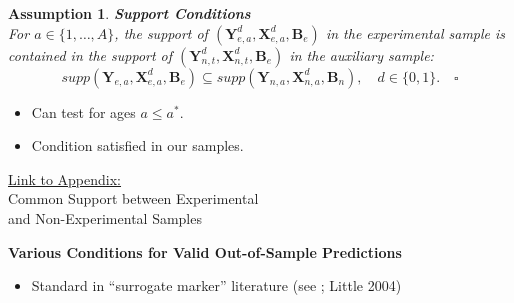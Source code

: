 \documentclass[static]{JJH-Beamer}
\newtheorem{assumption}{Assumption}
\begin{document}
\begin{frame}

\begin{assumption} \label{ass:contain} \textbf{Support Conditions} \\
For $a \in \{ 1, \ldots, A \}$, the support of $\left( \bm{Y}^d_{e,a}, \bm{X}^d_{e,a}, \bm{B}_e \right)$ in the experimental sample is contained in the support of $\left( \bm{Y}^d_{n,t}, \bm{X}^d_{n,t}, \bm{B}_e \right)$ in the auxiliary sample:
\begin{equation}
supp( \bm{Y}_{e,a}, \bm{X}^d_{e,a}, \bm{B}_e ) \subseteq supp( \bm{Y}_{n,a}, \bm{X}^d_{n,a}, \bm{B}_n ), \quad d \in \{0,1\}. \quad \square
\end{equation}
\end{assumption}

\begin{itemize}
\item Can test for ages $a\leq a^\ast$.
\item Condition satisfied in our samples.
\end{itemize}

\end{frame}

\begin{frame}

\hypertarget{ret:doughnut}{}
\begin{center}
\hyperlink{doughnut}{\underline{Link to Appendix:}}\\
Common Support between Experimental\\ and Non-Experimental Samples
\end{center}

\end{frame}

\begin{frame}

\begin{center}
\textbf{Various Conditions for Valid Out-of-Sample Predictions}
\end{center}

\end{frame}

\begin{frame}

\begin{itemize}
\item Standard in ``surrogate marker'' literature (see \citealp{Prentice_1989_Surrogate_SiM}; Little 2004)
\end{itemize}

\end{frame}
\end{document}
